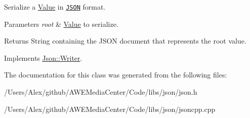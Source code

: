 Serialize a \hyperlink{class_json_1_1_value}{Value} in \href{http://www.json.org}{\tt J\-S\-O\-N} format. 


\begin{DoxyParams}{Parameters}
{\em root} & \hyperlink{class_json_1_1_value}{Value} to serialize. \\
\hline
\end{DoxyParams}
\begin{DoxyReturn}{Returns}
String containing the J\-S\-O\-N document that represents the root value. 
\end{DoxyReturn}


Implements \hyperlink{class_json_1_1_writer}{Json\-::\-Writer}.



The documentation for this class was generated from the following files\-:\begin{DoxyCompactItemize}
\item 
/\-Users/\-Alex/github/\-A\-W\-E\-Media\-Center/\-Code/libs/json/json.\-h\item 
/\-Users/\-Alex/github/\-A\-W\-E\-Media\-Center/\-Code/libs/json/jsoncpp.\-cpp\end{DoxyCompactItemize}
